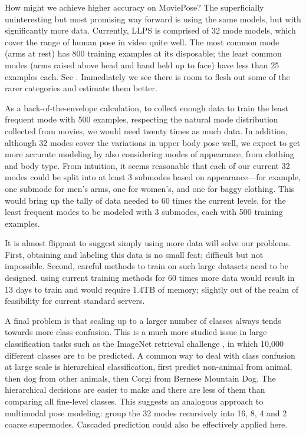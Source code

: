   How might we achieve higher accuracy on MoviePose?  The superficially 
uninteresting but most promising way forward is using the same models, but with 
significantly more data.  Currently, LLPS is comprised of 32 mode models, which 
cover the range of human pose in video quite well.  The most common mode (arms 
at rest) has 800 training examples at its disposable; the least common modes 
(arms raised above head and hand held up to face) have less than 25 examples 
each.  See .  Immediately we see there is room to 
flesh out some of the rarer categories and estimate them better.  

As a back-of-the-envelope calculation, to collect enough data to train the 
least frequent mode with 500 examples, respecting the natural mode distribution 
collected from movies, we would need twenty times as much data.  In addition, 
although 32 modes cover the variations in upper body pose well, we expect to 
get more accurate modeling by also considering modes of appearance, from 
clothing and body type.  From intuition, it seems reasonable that each of our 
current 32 modes could be split into at least 3 submodes based on 
appearance---for example, one submode for men's arms, one for women's, and one 
for baggy clothing.  This would bring up the tally of data needed to 60 times 
the current levels, for the least frequent modes to be modeled with 3 submodes, 
each with 500 training examples.

It is almost flippant to suggest simply using more data will solve our 
problems.  First, obtaining and labeling this data is no small feat; difficult 
but not impossible.  Second, careful methods to train on such large datasets 
need to be designed.  \Naively using current training methods for 60 times more 
data would result in 13 days to train and would require 1.4TB of memory; 
slightly out of the realm of feasibility for current standard servers.  

A final problem is that scaling up to a larger number of classes always tends 
towards more class confusion.  This is a much more studied issue in large 
classification tasks such as the ImageNet retrieval challenge \citep{imagenet}, 
in which 10,000 different classes are to be predicted.
A common way to deal with class confusion at large scale is hierarchical 
classification, \eg first predict non-animal from animal, then dog from other 
animals, then Corgi from Bernese Mountain Dog.  The hierarchical decisions are 
easier to make and there are less of them than comparing all fine-level 
classes.  This suggests an analogous approach to multimodal pose modeling: 
group the 32 modes recursively into 16, 8, 4 and 2 coarse supermodes.  Cascaded 
prediction could also be effectively applied here.

